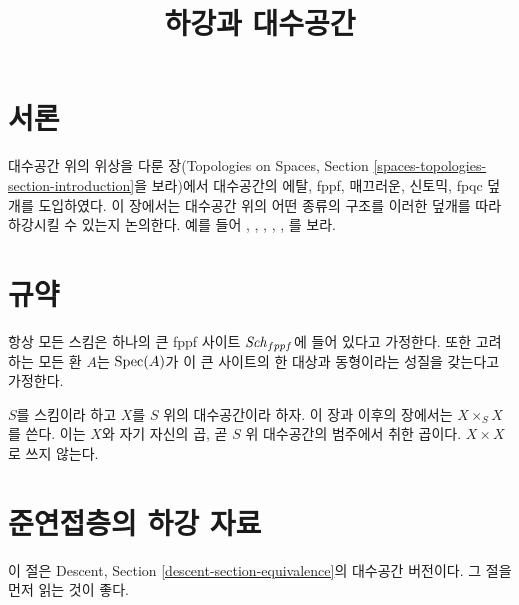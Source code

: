 

%


\title{하강과 대수공간}

\maketitle

\label{section-phantom}

\tableofcontents

\section{서론}
\label{section-introduction}

\noindent
대수공간 위의 위상을 다룬 장(Topologies on Spaces, Section
\ref{spaces-topologies-section-introduction}을 보라)에서 대수공간의
에탈, fppf, 매끄러운, 신토믹, fpqc 덮개를 도입하였다. 이 장에서는
대수공간 위의 어떤 종류의 구조를 이러한 덮개를 따라 하강시킬 수 있는지
논의한다. 예를 들어 \cite{Gr-I}, \cite{Gr-II}, \cite{Gr-III},
\cite{Gr-IV}, \cite{Gr-V}, \cite{Gr-VI}를 보라.

\section{규약}
\label{section-conventions}

\noindent
항상 모든 스킴은 하나의 큰 fppf 사이트 $\mathit{Sch}_{fppf}$에 들어 있다고
가정한다. 또한 고려하는 모든 환 $A$는 $\mathop{\mathrm{Spec}}(A)$가 이 큰 사이트의 한
대상과 동형이라는 성질을 갖는다고 가정한다.

\medskip\noindent
$S$를 스킴이라 하고 $X$를 $S$ 위의 대수공간이라 하자. 이 장과 이후의
장에서는 $X \times_S X$를 쓴다. 이는 $X$와 자기 자신의 곱, 곧 $S$ 위
대수공간의 범주에서 취한 곱이다. $X \times X$로 쓰지 않는다.

\section{준연접층의 하강 자료}
\label{section-equivalence}

\noindent
이 절은 Descent, Section \ref{descent-section-equivalence}의 대수공간
버전이다. 그 절을 먼저 읽는 것이 좋다.

